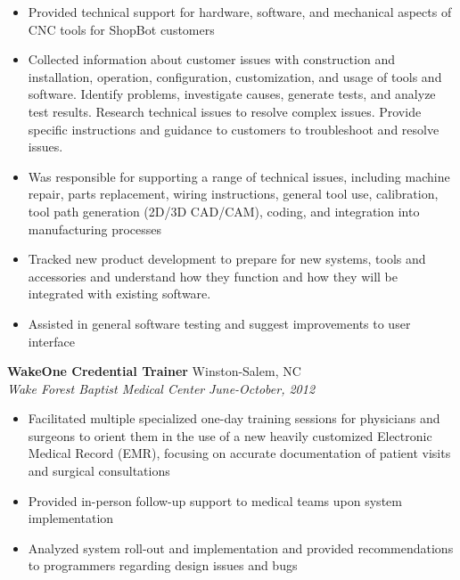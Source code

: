 \documentclass[10pt]{article}
\begin{document}
\begin{itemize}\raggedright
\setlength{\itemsep}{0pt}

\item Provided technical support for hardware, software, and mechanical
aspects of CNC tools for ShopBot customers

\item Collected information about customer issues with construction and
installation, operation, configuration, customization, and usage of tools
and software. Identify problems, investigate causes, generate tests,
and analyze test results. Research technical issues to resolve complex
issues. Provide specific instructions and guidance to customers to
troubleshoot and resolve issues.

\item Was responsible for supporting a range of technical issues, including
machine repair, parts replacement, wiring instructions, general tool use,
calibration, tool path generation (2D/3D CAD/CAM), coding, and integration
into manufacturing processes

\item Tracked new product development to prepare for new systems, tools and
accessories and understand how they function and how they will be integrated
with existing software.

\item Assisted in general software testing and suggest improvements to user
interface

\end{itemize}

\noindent
{\bf WakeOne Credential Trainer} \hfill Winston-Salem, NC\\
{\it Wake Forest Baptist Medical Center} \hfill {\it June-October, 2012}

\begin{itemize}\raggedright
\setlength{\itemsep}{0pt}

\item Facilitated multiple specialized one-day training sessions for physicians
and surgeons to orient them in the use of a new heavily customized Electronic
Medical Record (EMR), focusing on accurate documentation of patient visits
and surgical consultations

\item Provided in-person follow-up support to medical teams upon system
implementation

\item Analyzed system roll-out and implementation and provided
recommendations to programmers regarding design issues and bugs

\end{itemize}
\end{document}
